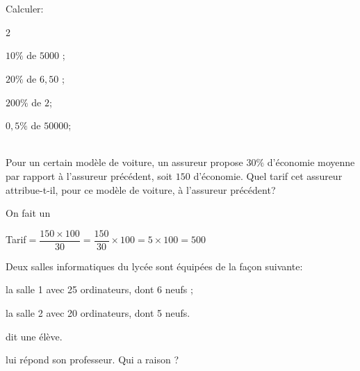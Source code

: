 \documentclass[a4paper,10pt]{book}        %
\begin{document}
\ \\

\\
Calculer:
\begin{multicols}{2}
	\begin{enumMet}
		\item $10 \%$ de $5 000$ ;
		\item $20 \%$ de $6,50$ ;
		\item $200 \%$ de $2$;
		\item $0,5 \%$ de $50 000$;
	\end{enumMet}
\end{multicols}	

 \\
Pour un certain modèle de voiture, un assureur propose $30\%$
d'économie moyenne par rapport à l'assureur précédent, soit
$150$ \EUR{} d'économie. Quel tarif cet assureur attribue-t-il, pour
ce modèle de voiture, à l'assureur précédent?

\begin{corrBox}
On fait un 	

Tarif$=\dfrac{150\times 100}{30}=\dfrac{150}{30}\times 100=5\times 100=500$
\end{corrBox}

Deux salles informatiques du lycée sont équipées de la façon suivante:

\begin{itemMet}
	\item la salle 1 avec 25 ordinateurs, dont 6 neufs ;
	\item la salle 2 avec 20 ordinateurs, dont 5 neufs.
\end{itemMet}
	 dit une élève.
	
	 lui répond son professeur. Qui a raison ?


\ \\
\end{document}
